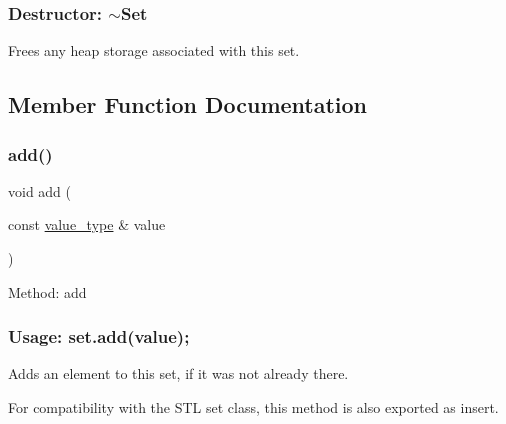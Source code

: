 \subsubsection*{Destructor\+: $\sim$\+Set }

Frees any heap storage associated with this set. 



\subsection{Member Function Documentation}
\mbox{\label{classstanfordcpplib_1_1collections_1_1GenericSet_a7cfcf4823a6ebadb0244d0943e5ea727}} 
\subsubsection{\texorpdfstring{add()}{add()}}
{\footnotesize\ttfamily void add (\begin{DoxyParamCaption}\item[{const \mbox{\hyperlink{classstanfordcpplib_1_1collections_1_1GenericSet_a669c81f158766925e7293f97c0099b28}{value\+\_\+type}} \&}]{value }\end{DoxyParamCaption})}



Method\+: add \subsubsection*{Usage\+: set.\+add(value); }

Adds an element to this set, if it was not already there. 

For compatibility with the S\+TL {\ttfamily set} class, this method is also exported as {\ttfamily insert}. \mbox{\label{classstanfordcpplib_1_1collections_1_1GenericSet_ad7f4cd8986fd068b79d2a69a79348a7e}} 
